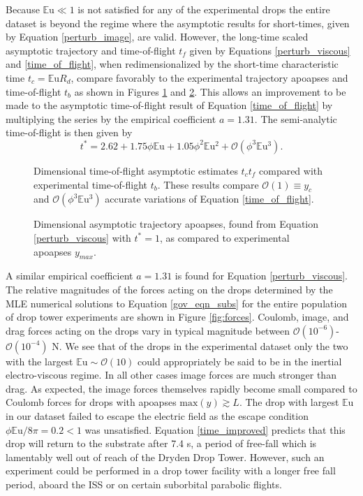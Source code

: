 \documentclass[aip,reprint, floatfix]{revtex4-1}
\begin{document}
Because $\mathbb{E}\mbox{u} \ll 1$ is not satisfied for any of the experimental drops the entire dataset is beyond the regime where the asymptotic results for short-times, given by Equation \ref{perturb_image}, are valid. However, the long-time scaled asymptotic trajectory  and time-of-flight $t_f$ given by Equations \ref{perturb_viscous} and \ref{time_of_flight}, when redimensionalized by the short-time characteristic time $t_c=\mathbb{E}\mbox{u} R_d$, compare favorably to the experimental trajectory apoapses and time-of-flight $t_b$ as shown in Figures \ref{fig:times2} and \ref{fig:ymaxes}. This allows an improvement to be made to the asymptotic time-of-flight result of Equation \ref{time_of_flight} by multiplying the series by the empirical coefficient $a = 1.31$. The semi-analytic time-of-flight is then given by
\begin{equation}
\label{time_improved}
t^* = 2.62 + 1.75\phi\mathbb{E}\mbox{u} + 1.05\phi^2\mathbb{E}\mbox{u}^{2} + \mathcal{O}(\phi^3\mathbb{E}\mbox{u}^{3}).
\end{equation}
\begin{figure}[htb]
    \centering
    \resizebox{0.5\textwidth}{!}{}
    \caption{Dimensional time-of-flight asymptotic estimates $t_c t_f$ compared with experimental time-of-flight $t_b$. These results compare $\mathcal{O}(1) \equiv y_c$ and $\mathcal{O}(\phi^3\mathbb{E}\mbox{u}^{3})$ accurate variations of Equation \ref{time_of_flight}. \label{fig:times2}}
\end{figure}
\begin{figure}[htb]
    \centering
    \resizebox{0.5\textwidth}{!}{}
    \caption{Dimensional asymptotic trajectory apoapses, found from Equation \ref{perturb_viscous} with $t^*=1$, as compared to experimental apoapses $y_{max}$.\label{fig:ymaxes}}
\end{figure}
A similar empirical coefficient $a = 1.31$ is found for Equation \ref{perturb_viscous}. 
The relative magnitudes of the forces acting on the drops determined by the MLE numerical solutions to Equation \ref{gov_eqn_subs} for the entire population of drop tower experiments are shown in Figure \ref{fig:forces}. Coulomb, image, and drag forces acting on the drops vary in typical magnitude between $\mathcal{O}(10^{-6})$-$\mathcal{O}(10^{-4})$ N. We see that of the drops in the experimental dataset only the two with the largest $\mathbb{E}\mbox{u} \sim \mathcal{O}(10)$ could appropriately be said to be in the inertial electro-viscous regime. In all other cases image forces are much stronger than drag. As expected, the image forces themselves rapidly become small compared to Coulomb forces for drops with apoapses $\mbox{max}\left( y\right) \gtrsim L$. The drop with largest $\mathbb{E}\mbox{u}$ in our dataset failed to escape the electric field as the escape condition $\phi \mathbb{E}\mbox{u} / 8\pi = 0.2 < 1$ was unsatisfied. Equation \ref{time_improved} predicts that this drop will return to the substrate after 7.4 s, a period of free-fall which is lamentably well out of reach of the Dryden Drop Tower. However, such an experiment could be performed in a drop tower facility with a longer free fall period, aboard the ISS or on certain suborbital parabolic flights.
\end{document}
